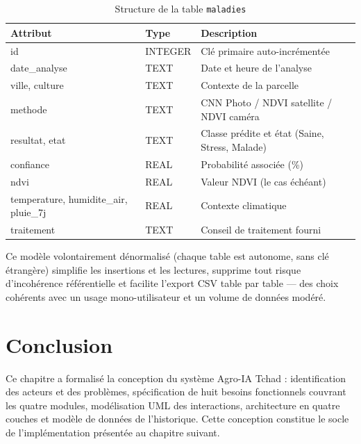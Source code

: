 \begin{table}[H]
	\centering
	\caption{Structure de la table \texttt{maladies}}
	\label{tab:table_mal}
	\small
	\begin{tabularx}{\textwidth}{llX}
		\toprule
		\textbf{Attribut} & \textbf{Type} & \textbf{Description} \\
		\midrule
		id             & INTEGER & Clé primaire auto-incrémentée \\
		date\_analyse  & TEXT    & Date et heure de l'analyse \\
		ville, culture & TEXT    & Contexte de la parcelle \\
		methode        & TEXT    & CNN Photo / NDVI satellite /
		NDVI caméra \\
		resultat, etat & TEXT    & Classe prédite et état
		(Saine, Stress, Malade) \\
		confiance      & REAL    & Probabilité associée (\%) \\
		ndvi           & REAL    & Valeur NDVI (le cas échéant) \\
		temperature, humidite\_air, pluie\_7j & REAL & Contexte
		climatique \\
		traitement     & TEXT    & Conseil de traitement fourni \\
		\bottomrule
	\end{tabularx}
\end{table}

Ce modèle volontairement dénormalisé (chaque table est autonome,
sans clé étrangère) simplifie les insertions et les lectures,
supprime tout risque d'incohérence référentielle et facilite
l'export CSV table par table --- des choix cohérents avec un
usage mono-utilisateur et un volume de données modéré.

\section*{Conclusion}

Ce chapitre a formalisé la conception du système Agro-IA Tchad :
identification des acteurs et des problèmes, spécification de
huit besoins fonctionnels couvrant les quatre modules,
modélisation UML des interactions, architecture en quatre couches
et modèle de données de l'historique. Cette conception constitue
le socle de l'implémentation présentée au chapitre suivant.